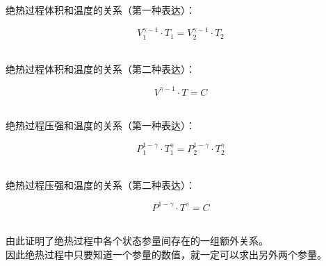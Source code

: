 \documentclass[UTF8]{ctexart}
\begin{document}
    绝热过程体积和温度的关系（第一种表达）：
    \begin{large}
        \begin{equation*}
            V_1^{\gamma-1}\cdot T_1=V_2^{\gamma-1}\cdot T_2
        \end{equation*}
    \end{large}\\
    绝热过程体积和温度的关系（第二种表达）：
    \begin{large}
        \begin{equation*}
            V^{\gamma-1}\cdot T=C
        \end{equation*}
    \end{large}\\
    绝热过程压强和温度的关系（第一种表达）：
    \begin{large}
        \begin{equation*}
            P_1^{1-\gamma}\cdot T_1^{\gamma}=P_2^{1-\gamma}\cdot T_2^{\gamma}
        \end{equation*}
    \end{large}\\
    绝热过程压强和温度的关系（第二种表达）：
    \begin{large}
        \begin{equation*}
            P^{1-\gamma}\cdot T^{\gamma}=C
        \end{equation*}
    \end{large}\\
    由此证明了绝热过程中各个状态参量间存在的一组额外关系。\\[3mm]
    因此绝热过程中只要知道一个参量的数值，就一定可以求出另外两个参量。
\end{document}
